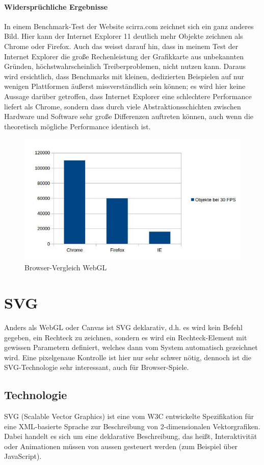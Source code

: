 \documentclass[a4paper, 12pt]{article}
\begin{document}
\paragraph{Widersprüchliche Ergebnisse} In einem Benchmark-Test der Website scirra.com zeichnet sich ein ganz anderes Bild. Hier kann der Internet Explorer 11 deutlich mehr Objekte zeichnen als Chrome oder Firefox. Auch das weisst darauf hin, dass in meinem Test der Internet Explorer die große Rechenleistung der Grafikkarte aus unbekannten Gründen, höchstwahrscheinlich Treiberproblemen, nicht nutzen kann. Daraus wird ersichtlich, dass Benchmarks mit kleinen, dedizierten Beispielen auf nur wenigen Plattformen äußerst missverständlich sein können; es wird hier keine Aussage darüber getroffen, dass Internet Explorer eine schlechtere Performance liefert als Chrome, sondern dass durch viele Abstraktionsschichten zwischen Hardware und Software sehr große Differenzen auftreten können, auch wenn die theoretisch mögliche Performance identisch ist.
\begin{figure}[H]
	\includegraphics[width=\textwidth]{assets/browser_comp_webgl} 
	\caption{Browser-Vergleich WebGL}
	\label{browser_comp_webgl}
\end{figure}
\newpage
\section{SVG}
Anders als WebGL oder Canvas ist SVG deklarativ, d.h. es wird kein Befehl gegeben, ein Rechteck zu zeichnen, sondern es wird ein Rechteck-Element mit gewissen Parametern definiert, welches dann vom System automatisch gezeichnet wird. Eine pixelgenaue Kontrolle ist hier nur sehr schwer nötig, dennoch ist die SVG-Technologie sehr interessant, auch für Browser-Spiele.\cite{SVGSpec}
\subsection{Technologie}
SVG (Scalable Vector Graphics) ist eine vom W3C entwickelte Spezifikation für eine XML-basierte Sprache zur Beschreibung von 2-dimensionalen Vektorgrafiken. Dabei handelt es sich um eine deklarative Beschreibung, das heißt, Interaktivität oder Animationen müssen von aussen gesteuert werden (zum Beispiel über JavaScript).
\end{document}
